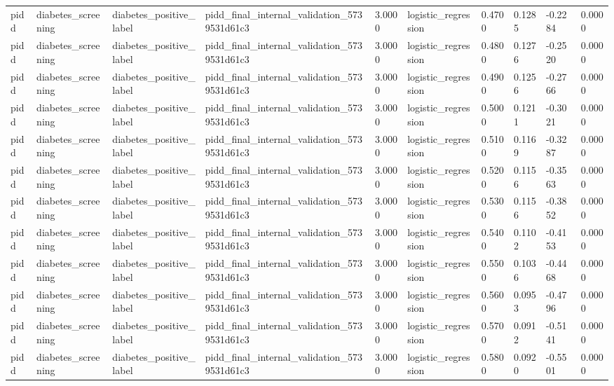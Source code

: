 \begin{tabular}{llllllllll}
pidd & diabetes\_screening & diabetes\_positive\_label & pidd\_final\_internal\_validation\_5739531d61c3 & 3.0000 & logistic\_regression & 0.4700 & 0.1285 & -0.2284 & 0.0000 \\
pidd & diabetes\_screening & diabetes\_positive\_label & pidd\_final\_internal\_validation\_5739531d61c3 & 3.0000 & logistic\_regression & 0.4800 & 0.1276 & -0.2520 & 0.0000 \\
pidd & diabetes\_screening & diabetes\_positive\_label & pidd\_final\_internal\_validation\_5739531d61c3 & 3.0000 & logistic\_regression & 0.4900 & 0.1256 & -0.2766 & 0.0000 \\
pidd & diabetes\_screening & diabetes\_positive\_label & pidd\_final\_internal\_validation\_5739531d61c3 & 3.0000 & logistic\_regression & 0.5000 & 0.1211 & -0.3021 & 0.0000 \\
pidd & diabetes\_screening & diabetes\_positive\_label & pidd\_final\_internal\_validation\_5739531d61c3 & 3.0000 & logistic\_regression & 0.5100 & 0.1169 & -0.3287 & 0.0000 \\
pidd & diabetes\_screening & diabetes\_positive\_label & pidd\_final\_internal\_validation\_5739531d61c3 & 3.0000 & logistic\_regression & 0.5200 & 0.1156 & -0.3563 & 0.0000 \\
pidd & diabetes\_screening & diabetes\_positive\_label & pidd\_final\_internal\_validation\_5739531d61c3 & 3.0000 & logistic\_regression & 0.5300 & 0.1156 & -0.3852 & 0.0000 \\
pidd & diabetes\_screening & diabetes\_positive\_label & pidd\_final\_internal\_validation\_5739531d61c3 & 3.0000 & logistic\_regression & 0.5400 & 0.1102 & -0.4153 & 0.0000 \\
pidd & diabetes\_screening & diabetes\_positive\_label & pidd\_final\_internal\_validation\_5739531d61c3 & 3.0000 & logistic\_regression & 0.5500 & 0.1036 & -0.4468 & 0.0000 \\
pidd & diabetes\_screening & diabetes\_positive\_label & pidd\_final\_internal\_validation\_5739531d61c3 & 3.0000 & logistic\_regression & 0.5600 & 0.0953 & -0.4796 & 0.0000 \\
pidd & diabetes\_screening & diabetes\_positive\_label & pidd\_final\_internal\_validation\_5739531d61c3 & 3.0000 & logistic\_regression & 0.5700 & 0.0912 & -0.5141 & 0.0000 \\
pidd & diabetes\_screening & diabetes\_positive\_label & pidd\_final\_internal\_validation\_5739531d61c3 & 3.0000 & logistic\_regression & 0.5800 & 0.0920 & -0.5501 & 0.0000 \\

\end{tabular}
